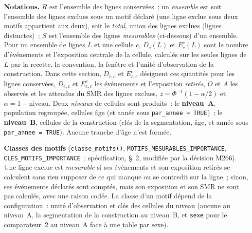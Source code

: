\documentclass[a4paper,11pt]{article}
\newcommand{\code}[1]{\texttt{\small #1}}
\begin{document}
{\medskip
\textbf{Notations.} $R$ est l'ensemble des lignes conservées~; un
\emph{ensemble} est soit l'ensemble des lignes exclues sous un motif déclaré
(une ligne exclue sous deux motifs appartient aux deux), soit le
\emph{total}, union des lignes exclues (lignes distinctes)~; $S$ est
l'ensemble des lignes \emph{mesurables} (ci-dessous) d'un ensemble. Pour un
ensemble de lignes $L$ et une cellule $c$, $D_c(L)$ et $E^c_c(L)$ sont le
nombre d'événements et l'exposition centrale de la cellule, calculés sur les
seules lignes de $L$ par la recette, la convention, la fenêtre et l'unité
d'observation de la construction. Dans cette section, $D_{r,c}$ et
$E^c_{r,c}$ désignent ces quantités pour les lignes conservées, $D_{e,c}$
et $E^c_{e,c}$ les événements et l'exposition \emph{retirés}, $O$ et $A$
les observés et les attendus du SMR des lignes exclues, $z = \Phi^{-1}(1 -
\alpha/2)$ et $\alpha = 1 - \text{niveau}$. Deux \emph{niveaux} de cellules
sont produits~: le \textbf{niveau~A}, population regroupée, cellules âge (et
année sous \code{par\_annee = TRUE})~; le \textbf{niveau~B}, cellules de la
construction (clés de la segmentation, âge, et année sous
\code{par\_annee = TRUE}). Aucune tranche d'âge n'est formée.

\medskip
\textbf{Classes des motifs} (\code{classe\_motifs()},
\code{MOTIFS\_MESURABLES\_IMPORTANCE}, \code{CLES\_MOTIFS\_IMPORTANCE}~;
spécification, §~2, modifiée par la décision M266). Une ligne exclue est
\emph{mesurable} si ses événements et son exposition retirés se calculent
sans rien supposer de ce qui manque ou se contredit sur la ligne~; sinon,
ses événements déclarés sont comptés, mais son exposition et son SMR ne
sont pas calculés, avec une raison codée. La classe d'un motif dépend de la
configuration~: unité d'observation et clés des cellules du niveau (aucune
au niveau~A, la segmentation de la construction au niveau~B, et \code{sexe}
pour le comparateur~2 au niveau~A face à une table par sexe).

}
\end{document}
